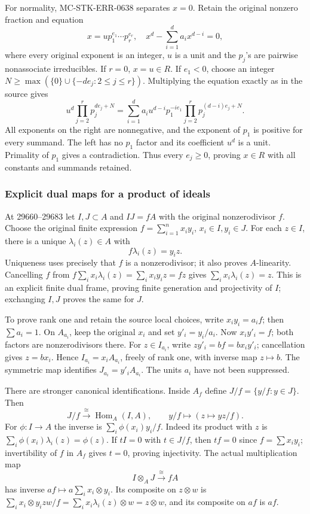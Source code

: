 For normality, MC-STK-ERR-0638 separates \(x=0\). Retain the original nonzero fraction and equation \[
 x=u p_1^{e_1}\cdots p_r^{e_r},\quad
 x^d-\sum_{i=1}^d a_i x^{d-i}=0,
\] where every original exponent is an integer, \(u\) is a unit and the \(p_j\)'s are pairwise nonassociate irreducibles. If \(r=0\), \(x=u\in R\). If \(e_1<0\), choose an integer \(N\ge\max(\{0\}\cup\{-d e_j:2\le j\le r\})\). Multiplying the equation exactly as in the source gives \[
 u^d\prod_{j=2}^r p_j^{de_j+N}
 =\sum_{i=1}^d a_i u^{d-i}p_1^{-i e_1}
                  \prod_{j=2}^r p_j^{(d-i)e_j+N}.
\] All exponents on the right are nonnegative, and the exponent of \(p_1\) is positive for every summand. The left has no \(p_1\) factor and its coefficient \(u^d\) is a unit. Primality of \(p_1\) gives a contradiction. Thus every \(e_j\ge0\), proving \(x\in R\) with all constants and summands retained.

\subsubsection{Explicit dual maps for a product of ideals}\label{algebra-proof-029-explicit-dual-maps-for-a-product-of-ideals}

At 29660--29683 let \(I,J\subset A\) and \(IJ=fA\) with the original nonzerodivisor \(f\). Choose the original finite expression \(f=\sum_{i=1}^n x_i y_i\), \(x_i\in I,y_i\in J\). For each \(z\in I\), there is a unique \(\lambda_i(z)\in A\) with \[
 f\lambda_i(z)=y_i z.
\] Uniqueness uses precisely that \(f\) is a nonzerodivisor; it also proves \(A\)-linearity. Cancelling \(f\) from \(f\sum_i x_i\lambda_i(z)=\sum_i x_i y_i z=fz\) gives \(\sum_i x_i\lambda_i(z)=z\). This is an explicit finite dual frame, proving finite generation and projectivity of \(I\); exchanging \(I,J\) proves the same for \(J\).

To prove rank one and retain the source local choices, write \(x_i y_i=a_i f\); then \(\sum a_i=1\). On \(A_{a_i}\), keep the original \(x_i\) and set \(y'_i=y_i/a_i\). Now \(x_i y'_i=f\); both factors are nonzerodivisors there. For \(z\in I_{a_i}\), write \(z y'_i=b f=b x_i y'_i\); cancellation gives \(z=b x_i\). Hence \(I_{a_i}=x_i A_{a_i}\), freely of rank one, with inverse map \(z\mapsto b\). The symmetric map identifies \(J_{a_i}=y'_i A_{a_i}\). The units \(a_i\) have not been suppressed.

There are stronger canonical identifications. Inside \(A_f\) define \(J/f=\{y/f:y\in J\}\). Then \[
 J/f\xrightarrow{\;\cong\;}\operatorname{Hom}_A(I,A),
 \qquad y/f\longmapsto(z\mapsto yz/f).
\] For \(\phi:I\to A\) the inverse is \(\sum_i\phi(x_i)y_i/f\). Indeed its product with \(z\) is \(\sum_i\phi(x_i)\lambda_i(z)=\phi(z)\). If \(tI=0\) with \(t\in J/f\), then \(tf=0\) since \(f=\sum x_i y_i\); invertibility of \(f\) in \(A_f\) gives \(t=0\), proving injectivity. The actual multiplication map \[
 I\otimes_A J\xrightarrow{\;\cong\;}fA
\] has inverse \(af\mapsto a\sum_i x_i\otimes y_i\). Its composite on \(z\otimes w\) is \(\sum_i x_i\otimes y_i zw/f=\sum_i x_i\lambda_i(z)\otimes w=z\otimes w\), and its composite on \(af\) is \(af\).

